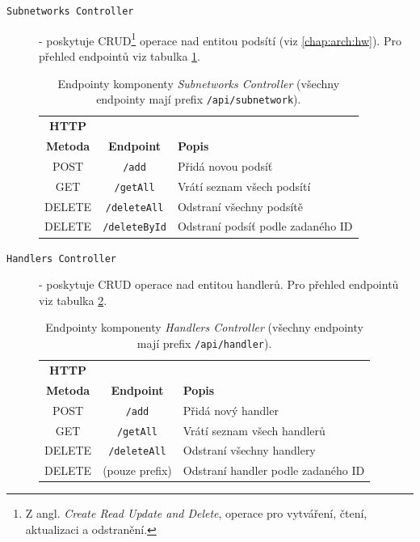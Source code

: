 \begin{description}
    \item[\texttt{Subnetworks Controller}] - poskytuje CRUD\footnote{Z angl. \textit{Create Read Update and Delete}, operace pro vytváření, čtení, aktualizaci a odstranění.} operace nad entitou podsítí (viz \ref{chap:arch:hw}). Pro přehled endpointů viz tabulka \ref{tab:master:api_subnetworks}.

    \begin{table}[h!]
        \begin{center}
            \begin{tabular}{|c|c|l|}
                \hline
          \textbf{HTTP} & & \\
          \textbf{Metoda} & \textbf{Endpoint} & \textbf{Popis} \\
            \hline
            POST & \texttt{/add} & Přidá novou podsíť \\
            GET & \texttt{/getAll} & Vrátí seznam všech podsítí \\
            DELETE & \texttt{/deleteAll} & Odstraní všechny podsítě \\
            DELETE & \texttt{/deleteById} & Odstraní podsíť podle zadaného ID \\
            \hline
            \end{tabular}
        \end{center}
        \caption{Endpointy komponenty \textit{Subnetworks Controller} (všechny endpointy mají prefix \texttt{/api/subnetwork}).}
        \label{tab:master:api_subnetworks}
    \end{table}

    \item[\texttt{Handlers Controller}] - poskytuje CRUD operace nad entitou handlerů. Pro přehled endpointů viz tabulka \ref{tab:master:api_handlers}.

    \begin{table}[h!]
        \begin{center}
            \begin{tabular}{|c|c|l|}
                \hline
          \textbf{HTTP} & & \\
          \textbf{Metoda} & \textbf{Endpoint} & \textbf{Popis} \\
            \hline
            POST & \texttt{/add} & Přidá nový handler \\
            GET & \texttt{/getAll} & Vrátí seznam všech handlerů \\
            DELETE & \texttt{/deleteAll} & Odstraní všechny handlery \\
            DELETE & (pouze prefix) & Odstraní handler podle zadaného ID \\
            \hline
            \end{tabular}
        \end{center}
        \caption{Endpointy komponenty \textit{Handlers Controller} (všechny endpointy mají prefix \texttt{/api/handler}).}
        \label{tab:master:api_handlers}
    \end{table}


\end{description}
